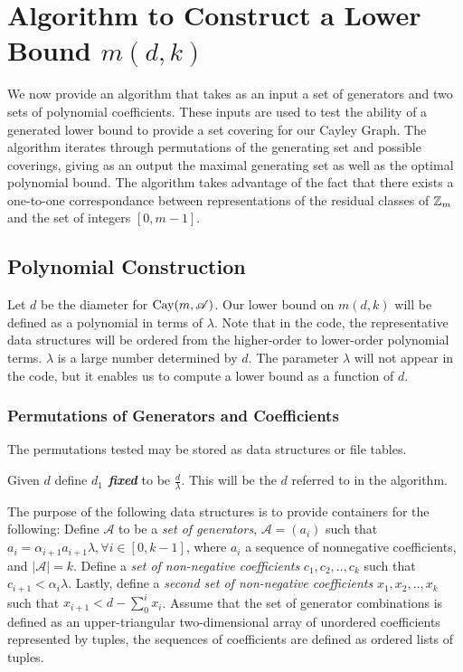 \section{Algorithm to Construct a Lower Bound $m(d, k)$}

We now provide an algorithm that takes as an input a set of generators and two sets of polynomial coefficients. These inputs are used to test the ability of a generated lower bound to provide a set covering for our Cayley Graph. The algorithm iterates through permutations of the generating set and possible coverings, giving as an output the maximal generating set as well as the optimal polynomial bound. \n
The algorithm takes advantage of the fact that there exists a one-to-one correspondance between representations of the residual classes of $\mbox{$\mathbb Z$}_m$ and the set of integers $[0, m-1]$.\n

\subsection{Polynomial Construction}
\noindent
Let $d$ be the diameter for $\operatorname{Cay}(m, \mathscr{A})$.\n 
Our lower bound on $m(d, k)$ will be defined as a polynomial in terms of $\lambda$. Note that in the code, the representative data structures will be ordered from the higher-order to lower-order polynomial terms.
$\lambda$ is a large number determined by $d$. The parameter $\lambda$ will not appear in the code, but it enables us to compute a lower bound as a function of $d$.\n

\subsubsection{Permutations of Generators and Coefficients}
The permutations tested may be stored as data structures or file tables.

\noindent
Given $d$ define \emph{\bf{$d_{1}$ fixed}} to be $\frac{d}{\lambda}$. This will be the $d$ referred to in the algorithm.\n

The purpose of the following data structures is to provide containers for the following:\n
Define $\mathscr{A}$ to be a \emph{set of generators}, $\mathscr{A} = (a_{i})$ such that $ a_{i} = \alpha_{i+1}a_{i+1}\lambda,  \forall i \in [0, k-1] $, where $a_i$ a sequence of nonnegative coefficients, and $\vert \mathscr{A} \vert = k$.\n
Define a \emph{set of non-negative coefficients} $c_1, c_2, .. , c_k$ such that $c_{i+1} < \alpha_{i} \lambda$.\n
Lastly, define a \emph{second set of non-negative coefficients} $x_1, x_2, .., x_{k}$ such that $x_{i+1} < d - \sum_{0}^{i}x_i$.
\noindent
Assume that the set of generator combinations is defined as an upper-triangular two-dimensional array of unordered coefficients represented by tuples, the sequences of coefficients are defined as ordered lists of tuples.

